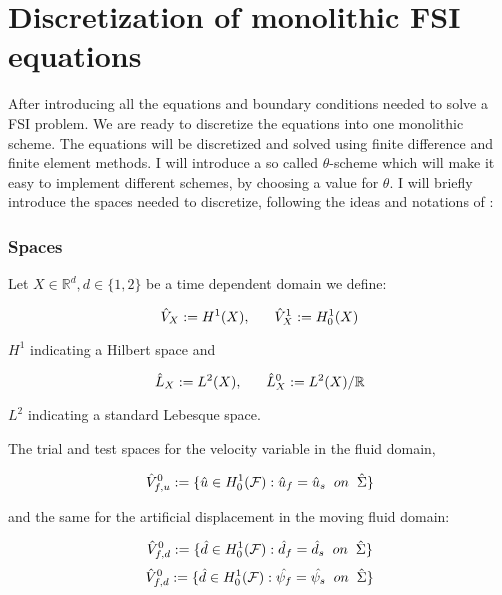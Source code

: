\section{Discretization of monolithic FSI equations}\label{Discretization}
After introducing all the equations and boundary conditions needed to solve a FSI problem. We are ready to discretize the equations into one monolithic scheme. The equations will be discretized and solved using finite difference and finite element methods. I will introduce a so called $\theta$-scheme which will make it easy to implement different schemes, by choosing a value for $\theta$.
I will briefly introduce the spaces needed to discretize, following the ideas and notations of \cite{Wick2011}:

\subsubsection{Spaces}
Let $ X \in \mathbb{R}^d , d \in\{ 1,2  \} $ be a time dependent domain we define:

\begin{equation}
\hat{V}_X := H^1(X), \hspace{6mm}  \hat{V}^1_X := H^1_0(X) 
\end{equation}

$ H^1 $ indicating a Hilbert space and

\begin{equation}
\hat{L}_X := L^2(X), \hspace{6mm} \hat{L}^0_X := L^2(X) / \mathbb{R}
\end{equation}

$L^2$ indicating a standard Lebesque space.

The trial and test spaces for the velocity variable in the fluid domain,

\begin{equation}
\hat{V}^0_{f,u} := \{ \hat{u} \in H^1_0(\mathcal{F}) : \hat{u}_f = \hat{u}_s \hspace{2mm} on \hspace{2mm} \hat{\Sigma}  \}
\end{equation}

and the same for the artificial displacement in the moving fluid domain:

\begin{equation}
\hat{V}^0_{f,d} := \{ \hat{d} \in H^1_0(\mathcal{F}) : \hat{d}_f = \hat{d}_s \hspace{2mm} on \hspace{2mm} \hat{\Sigma}  \}
\end{equation}
\begin{equation}
\hat{V}^0_{f,d} := \{ \hat{d} \in H^1_0(\mathcal{F}) : \hat{\psi_f} = \hat{\psi_s} \hspace{2mm} on \hspace{2mm} \hat{\Sigma}  \}
\end{equation}


